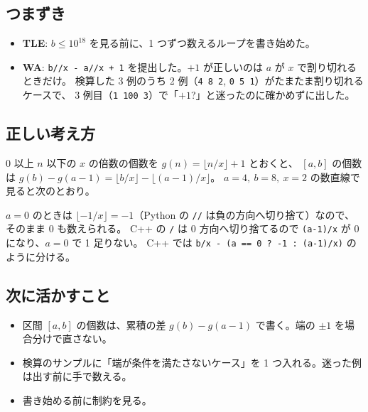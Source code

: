 \documentclass[a4paper]{article}
\begin{document}
\subsection*{つまずき}
\begin{itemize}
  \item \textbf{TLE}: $b \leq 10^{18}$ を見る前に、1 つずつ数えるループを書き始めた。
  \item \textbf{WA}: \verb|b//x - a//x + 1| を提出した。$+1$ が正しいのは $a$ が $x$ で割り切れるときだけ。
    検算した 3 例のうち 2 例（\texttt{4 8 2}, \texttt{0 5 1}）がたまたま割り切れるケースで、
    3 例目（\texttt{1 100 3}）で「$+1$?」と迷ったのに確かめずに出した。
\end{itemize}

\subsection*{正しい考え方}
$0$ 以上 $n$ 以下の $x$ の倍数の個数を $g(n) = \lfloor n/x \rfloor + 1$ とおくと、
$[a,b]$ の個数は $g(b) - g(a-1) = \lfloor b/x \rfloor - \lfloor (a-1)/x \rfloor$。
$a=4,\ b=8,\ x=2$ の数直線で見ると次のとおり。

\begin{center}
\end{center}

$a=0$ のときは $\lfloor -1/x \rfloor = -1$（Python の \verb|//| は負の方向へ切り捨て）なので、そのまま $0$ も数えられる。
C++ の \verb|/| は $0$ 方向へ切り捨てるので \verb|(a-1)/x| が $0$ になり、$a=0$ で 1 足りない。
C++ では \verb|b/x - (a == 0 ? -1 : (a-1)/x)| のように分ける。

\subsection*{次に活かすこと}
\begin{itemize}
  \item 区間 $[a,b]$ の個数は、累積の差 $g(b) - g(a-1)$ で書く。端の $\pm 1$ を場合分けで直さない。
  \item 検算のサンプルに「端が条件を満たさないケース」を 1 つ入れる。迷った例は出す前に手で数える。
  \item 書き始める前に制約を見る。
\end{itemize}
\end{document}

